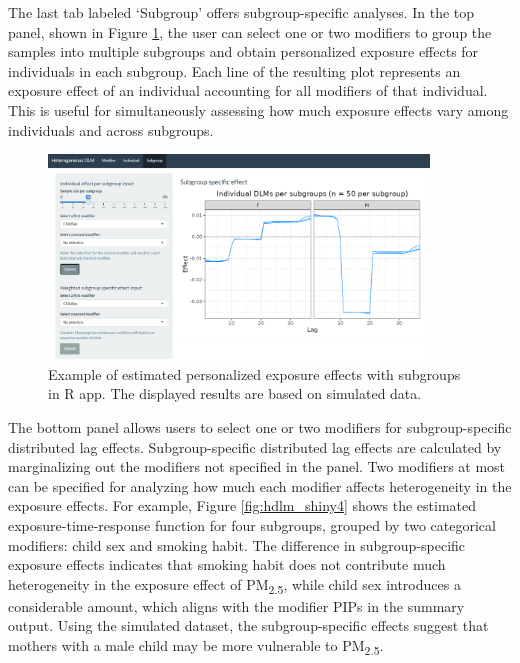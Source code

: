The last tab labeled `Subgroup' offers subgroup-specific analyses. In the top panel, shown in Figure \ref{fig:hdlm_shiny3}, the user can select one or two modifiers to group the samples into multiple subgroups and obtain personalized exposure effects for individuals in each subgroup. Each line of the resulting plot represents an exposure effect of an individual accounting for all modifiers of that individual. This is useful for simultaneously assessing how much exposure effects vary among individuals and across subgroups.
\begin{figure}[ht]
    \centering
    \includegraphics[width=0.9\textwidth]{images/HDLM_Shiny3.png}
    \caption{Example of estimated personalized exposure effects with subgroups in R  app. The displayed results are based on simulated data.}
    \label{fig:hdlm_shiny3}
\end{figure}
The bottom panel allows users to select one or two modifiers for subgroup-specific distributed lag effects. Subgroup-specific distributed lag effects are calculated by marginalizing out the modifiers not specified in the panel. Two modifiers at most can be specified for analyzing how much each modifier affects heterogeneity in the exposure effects. For example, Figure \ref{fig:hdlm_shiny4} shows the estimated exposure-time-response function for four subgroups, grouped by two categorical modifiers: child sex and smoking habit. The difference in subgroup-specific exposure effects indicates that smoking habit does not contribute much heterogeneity in the exposure effect of PM\textsubscript{2.5}, while child sex introduces a considerable amount, which aligns with the modifier PIPs in the summary output. Using the simulated dataset, the subgroup-specific effects suggest that mothers with a male child may be more vulnerable to PM\textsubscript{2.5}.

